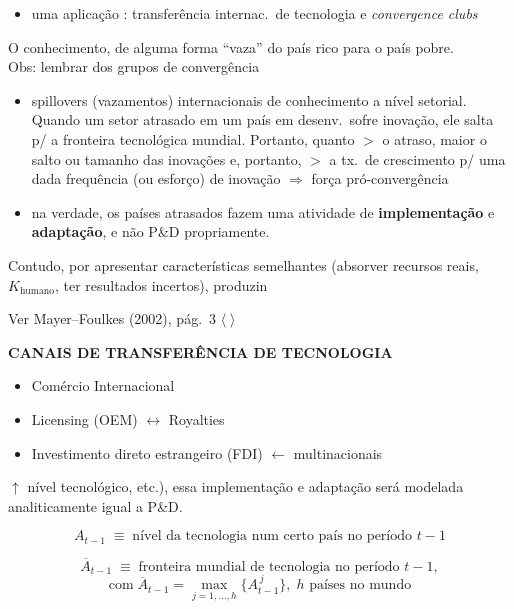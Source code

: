 \documentclass[a4paper,12pt]{article}[abntex2]
\begin{document}
\begin{itemize}
    \item uma aplicação : transferência internac.\ de tecnologia e \textit{convergence clubs} 
\end{itemize}

\noindent O conhecimento, de alguma forma “vaza” do país rico para o país pobre.\\
Obs: lembrar dos grupos de convergência

\begin{itemize}
    \item spillovers (vazamentos) internacionais de conhecimento a nível setorial.  
          Quando um setor atrasado em um país em desenv.\ sofre inovação, ele salta p/ a fronteira tecnológica mundial.  
          Portanto, quanto $>$ o atraso, maior o salto ou tamanho das inovações e, portanto, $>$ a tx.\ de crescimento p/ uma dada frequência (ou esforço) de inovação $\Longrightarrow$ força pró-convergência
    \item na verdade, os países atrasados fazem uma atividade de
          \textbf{implementação} e \textbf{adaptação}, e não P\&D propriamente.
\end{itemize}

Contudo, por apresentar características semelhantes (absorver recursos reais, $K_{\text{humano}}$, ter resultados incertos), produzin


\;Ver Mayer–Foulkes (2002), pág.\ 3 $\langle\;\rangle$


\textbf{CANAIS DE TRANSFERÊNCIA DE TECNOLOGIA}

\begin{itemize}
    \item Comércio Internacional
    \item Licensing (OEM) $\leftrightarrow$ Royalties
    \item Investimento direto estrangeiro (FDI) $\leftarrow$ multinacionais
\end{itemize}

$\uparrow$ nível tecnológico, etc.), essa implementação e adaptação será modelada
analiticamente igual a P\&D.

\[
A_{t-1} \;\equiv\; \text{nível da tecnologia num certo país no período } t-1
\]

\[
\overline{A}_{t-1} \;\equiv\; \text{fronteira mundial de tecnologia no período } t-1,
\]
\[
\text{com}\;
\overline{A}_{t-1}= \max_{j=1,\dots,h}\!\bigl\{A_{t-1}^{\,j}\bigr\},
\; h\text{ países no mundo}
\]
\end{document}
